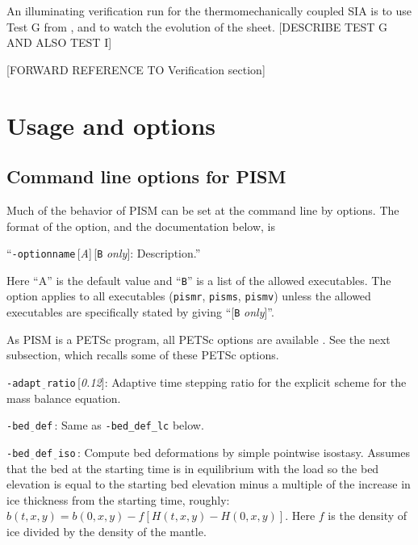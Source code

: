 \documentclass[11pt,final]{amsart}
\renewcommand{\t}[1]{\texttt{#1}}
\begin{document}
An illuminating verification run for the thermomechanically coupled SIA is to use Test G from \cite{BBL}, and to watch the evolution of the sheet. [DESCRIBE TEST G AND ALSO TEST I]

[FORWARD REFERENCE TO Verification section] 


\section{Usage and options}

\newcommand{\opt}[1]{\vspace{1mm}\noindent \large\texttt{-#1}\,:\quad\normalsize}
\newcommand{\optdef}[2]{\vspace{1mm}\noindent \large\texttt{-#1}\,[\textsl{#2}]:\quad\normalsize}
\newcommand{\optdefrestrict}[3]{\vspace{1mm}\noindent \large\texttt{-#1}\,[\textsl{#2}]\,[\texttt{#3} \textsl{only}]:\quad\normalsize}
\newcommand{\und}{$\underline{\,\,\,}$}

\subsection{Command line options for PISM}  Much of the behavior of PISM can be set at the command line by options.  The format of the option, and the documentation below, is

\centerline{``\optdefrestrict{optionname}{A}{B} Description.''}

\noindent Here ``A'' is the default value and ``\t{B}'' is a list of the allowed executables.  The option applies to all executables (\verb|pismr|, \verb|pisms|, \verb|pismv|) unless the allowed executables are specifically stated by giving ``[\t{B} \textsl{only}]''.

As PISM is a PETSc program, all PETSc options are available \cite{petsc-web-page,petsc-user-ref}.  See the next subsection, which recalls some of these PETSc options.
\bigskip

\optdef{adapt\und ratio}{0.12}  Adaptive time stepping ratio for the explicit scheme for the mass balance equation.

\opt{bed\und def} Same as \verb|-bed_def_lc| below.

\opt{bed\und def\und iso} Compute bed deformations by simple pointwise isostasy.  Assumes that the bed at the starting time is in equilibrium with the load so the bed elevation is equal to the starting bed elevation minus a multiple of the increase in ice thickness from the starting time, roughly: $b(t,x,y) = b(0,x,y) - f [H(t,x,y) - H(0,x,y)]$.  Here $f$ is the density of ice divided by the density of the mantle.
\end{document}
